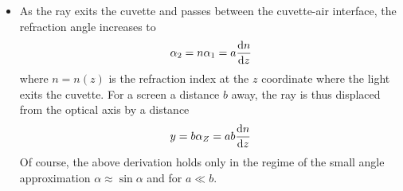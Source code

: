 \documentclass[11pt, a4paper]{article}
\begin{document}
\begin{itemize}
	\item As the ray exits the cuvette and passes between the cuvette-air interface, the refraction angle increases to
	\begin{equation*}
		\alpha_{2} = n \alpha_{1} = a \dv{n}{z}
	\end{equation*}
	where $ n = n(z) $ is the refraction index at the $ z $ coordinate where the light exits the cuvette. For a screen a distance $ b $ away, the ray is thus displaced from the optical axis by a distance 
	\begin{equation*}
		y = b \alpha_{Z} = a b \dv{n}{z}
	\end{equation*}
	Of course, the above derivation holds only in the regime of the small angle approximation $ \alpha \approx \sin \alpha $ and for $ a \ll b $. 
	
\end{itemize}
\end{document}
